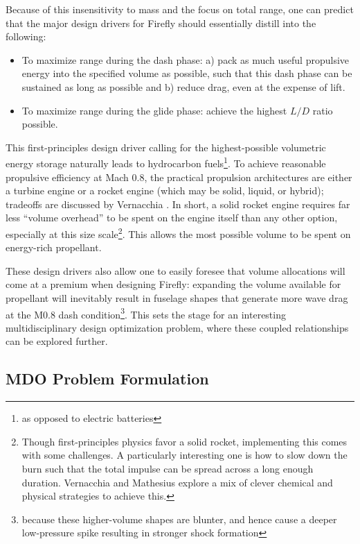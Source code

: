 Because of this insensitivity to mass and the focus on total range, one can predict that the major design drivers for Firefly should essentially distill into the following:
\begin{itemize}[noitemsep]
    \item To maximize range during the dash phase: a) pack as much useful propulsive energy into the specified volume as possible, such that this dash phase can be sustained as long as possible and b) reduce drag, even at the expense of lift.
    \item To maximize range during the glide phase: achieve the highest $L/D$ ratio possible.
\end{itemize}

This first-principles design driver calling for the highest-possible volumetric energy storage naturally leads to hydrocarbon fuels\footnote{as opposed to electric batteries}. To achieve reasonable propulsive efficiency at Mach 0.8, the practical propulsion architectures are either a turbine engine or a rocket engine (which may be solid, liquid, or hybrid); tradeoffs are discussed by Vernacchia \cite{vernacchia_development_2020}. In short, a solid rocket engine requires far less ``volume overhead'' to be spent on the engine itself than any other option, especially at this size scale\footnote{Though first-principles physics favor a solid rocket, implementing this comes with some challenges. A particularly interesting one is how to slow down the burn such that the total impulse can be spread across a long enough duration. Vernacchia \cite{vernacchia_development_2020} and Mathesius \cite{mathesius_integrated_2023, mathesius_firefly_2019} explore a mix of clever chemical and physical strategies to achieve this.}. This allows the most possible volume to be spent on energy-rich propellant.

These design drivers also allow one to easily foresee that volume allocations will come at a premium when designing Firefly: expanding the volume available for propellant will inevitably result in fuselage shapes that generate more wave drag at the M0.8 dash condition\footnote{because these higher-volume shapes are blunter, and hence cause a deeper low-pressure spike resulting in stronger shock formation}. This sets the stage for an interesting multidisciplinary design optimization problem, where these coupled relationships can be explored further.

\subsection{MDO Problem Formulation}
\label{sec:firefly-mdo}

